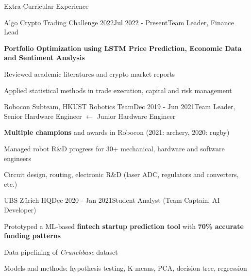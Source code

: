 \documentclass{resume}
\begin{document}
\newpage

\begin{rSection}{Extra-Curricular Experience}
    
    \begin{rSubsection}{Algo Crypto Trading Challenge 2022}{Jul 2022 - Present}{Team Leader, Finance Lead}{}
        \item \textbf{Portfolio Optimization using LSTM Price Prediction, Economic Data and Sentiment Analysis}
        \item Reviewed academic literatures and crypto market reports
        \item Applied statistical methods in trade execution, capital and risk management
    \end{rSubsection}
    
    \begin{rSubsection}{Robocon Subteam, HKUST Robotics Team}{Dec 2019 - Jun 2021}{Team Leader, Senior Hardware Engineer $\leftarrow$ Junior Hardware Engineer}{}
        \item \textbf{Multiple champions} and awards in Robocon (2021: archery, 2020: rugby)
        \item Managed robot R\&D progress for 30+ mechanical, hardware and software engineers
        \item Circuit design, routing, electronic R\&D (laser ADC, regulators and converters, etc.)
    \end{rSubsection}

    \begin{rSubsection}{UBS Zürich HQ}{Dec 2020 - Jan 2021}{Student Analyst (Team Captain, AI Developer)}{}
        \item Prototyped a ML-based \textbf{fintech startup prediction tool} with \textbf{70\% accurate funding patterns}
        \item Data pipelining of \emph{Crunchbase} dataset
        \item Models and methods: hypothesis testing, K-means, PCA, decision tree, regression
    \end{rSubsection}

\end{rSection}
\end{document}
